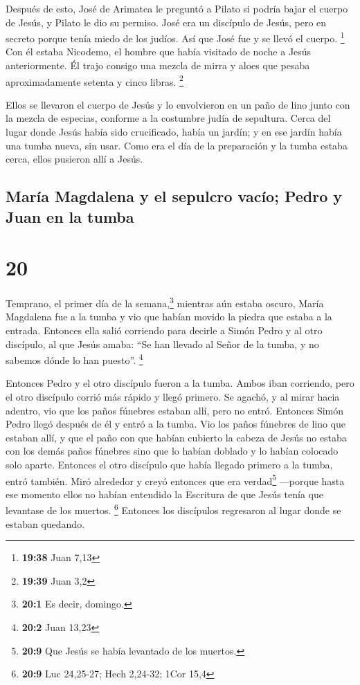  Después de esto, José de Arimatea le preguntó a Pilato
si podría bajar el cuerpo de Jesús, y Pilato le dio su permiso. José era
un discípulo de Jesús, pero en secreto porque tenía miedo de los judíos.
Así que José fue y se llevó el cuerpo. \footnote{\textbf{19:38} Juan
  7,13}  Con él estaba Nicodemo, el hombre que había
visitado de noche a Jesús anteriormente. Él trajo consigo una mezcla de
mirra y aloes que pesaba aproximadamente setenta y cinco libras.
\footnote{\textbf{19:39} Juan 3,2}

 Ellos se llevaron el cuerpo de Jesús y lo envolvieron en
un paño de lino junto con la mezcla de especias, conforme a la costumbre
judía de sepultura. Cerca del lugar donde Jesús había sido crucificado,
había un jardín;  y en ese jardín había una tumba nueva,
sin usar.  Como era el día de la preparación y la tumba
estaba cerca, ellos pusieron allí a Jesús.

\hypertarget{maruxeda-magdalena-y-el-sepulcro-vacuxedo-pedro-y-juan-en-la-tumba}{%
\subsection{María Magdalena y el sepulcro vacío; Pedro y Juan en la
tumba}\label{maruxeda-magdalena-y-el-sepulcro-vacuxedo-pedro-y-juan-en-la-tumba}}

\hypertarget{section-19}{%
\section{20}\label{section-19}}

 Temprano, el primer día de la semana,\footnote{\textbf{20:1}
  Es decir, domingo.} mientras aún estaba oscuro, María Magdalena fue a
la tumba y vio que habían movido la piedra que estaba a la entrada.
 Entonces ella salió corriendo para decirle a Simón Pedro
y al otro discípulo, al que Jesús amaba: ``Se han llevado al Señor de la
tumba, y no sabemos dónde lo han puesto''. \footnote{\textbf{20:2} Juan
  13,23}

 Entonces Pedro y el otro discípulo fueron a la tumba.
 Ambos iban corriendo, pero el otro discípulo corrió más
rápido y llegó primero.  Se agachó, y al mirar hacia
adentro, vio que los paños fúnebres estaban allí, pero no entró.
 Entonces Simón Pedro llegó después de él y entró a la
tumba. Vio los paños fúnebres de lino que estaban allí,  y
que el paño con que habían cubierto la cabeza de Jesús no estaba con los
demás paños fúnebres sino que lo habían doblado y lo habían colocado
solo aparte.  Entonces el otro discípulo que había llegado
primero a la tumba, entró también.  Miró alrededor y creyó
entonces que era verdad\footnote{\textbf{20:9} Que Jesús se había
  levantado de los muertos.} ---porque hasta ese momento ellos no habían
entendido la Escritura de que Jesús tenía que levantase de los muertos.
\footnote{\textbf{20:9} Luc 24,25-27; Hech 2,24-32; 1Cor 15,4}
 Entonces los discípulos regresaron al lugar donde se
estaban quedando.

